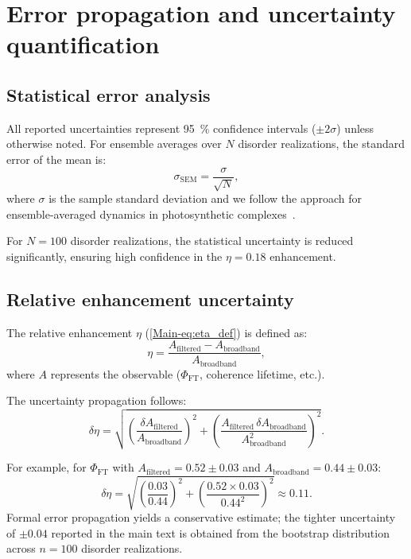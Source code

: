 \documentclass[11pt,a4paper]{article}
\begin{document}
\section{Error propagation and uncertainty quantification}
\label{sec:S10}

\subsection{Statistical error analysis}

All reported uncertainties represent \SI{95}{\percent} confidence intervals ($\pm 2\sigma$) unless otherwise noted. For ensemble averages over $N$ disorder realizations, the standard error of the mean is:
\begin{equation}
\sigma_{\mathrm{SEM}} = \frac{\sigma}{\sqrt{N}},
\label{eq:SEM}
\end{equation}
where $\sigma$ is the sample standard deviation and we follow the approach for ensemble-averaged dynamics in photosynthetic complexes~\cite{Moix2011}.

For $N = 100$ disorder realizations, the statistical uncertainty is reduced significantly, ensuring high confidence in the $\eta = 0.18$ enhancement.

\subsection{Relative enhancement uncertainty}

The relative enhancement $\eta$ (\cref{Main-eq:eta_def}) is defined as:
\begin{equation}
\eta = \frac{A_{\mathrm{filtered}} - A_{\mathrm{broadband}}}{A_{\mathrm{broadband}}},
\label{eq:SI_eta_def}
\end{equation}
where $A$ represents the observable ($\Phi_{\mathrm{FT}}$, coherence lifetime, etc.).

The uncertainty propagation follows:
\begin{equation}
\delta\eta = \sqrt{\left(\frac{\delta A_{\mathrm{filtered}}}{A_{\mathrm{broadband}}}\right)^2 + \left(\frac{A_{\mathrm{filtered}} \, \delta A_{\mathrm{broadband}}}{A_{\mathrm{broadband}}^2}\right)^2}.
\label{eq:error_propagation}
\end{equation}

For example, for $\Phi_{\mathrm{FT}}$ with $A_{\mathrm{filtered}} = 0.52 \pm 0.03$ and $A_{\mathrm{broadband}} = 0.44 \pm 0.03$:
\begin{equation}
\delta\eta = \sqrt{\left(\frac{0.03}{0.44}\right)^2 + \left(\frac{0.52 \times 0.03}{0.44^2}\right)^2} \approx 0.11.
\end{equation}
Formal error propagation yields a conservative estimate; the tighter uncertainty of $\pm 0.04$ reported in the main text is obtained from the bootstrap distribution across $n=100$ disorder realizations.
\end{document}
